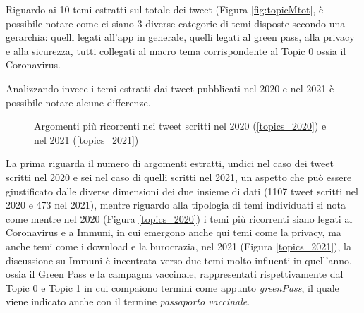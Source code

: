 Riguardo ai 10 temi estratti sul totale dei tweet (Figura \ref{fig:topicMtot}, è possibile notare come ci siano 3 diverse categorie di temi disposte secondo una gerarchia: quelli legati all'app in generale, quelli legati al green pass, alla privacy e alla sicurezza, tutti collegati al macro tema corrispondente al Topic 0 ossia il Coronavirus.

Analizzando invece i temi estratti dai tweet pubblicati nel 2020 e nel 2021 è possibile notare alcune differenze. 
\begin{figure}[H]
	\centering
	\quad
	\quad
	\setlength{\belowcaptionskip}{-10pt}
	\caption{Argomenti più ricorrenti nei tweet scritti nel 2020 (\ref{topics_2020}) e nel 2021 (\ref{topics_2021})}
	\label{fig: topicModels}
\end{figure}
La prima riguarda il numero di argomenti estratti, undici nel caso dei tweet scritti nel 2020 e sei nel caso di quelli scritti nel 2021, un aspetto che può essere giustificato dalle diverse dimensioni dei due insieme di dati (1107 tweet scritti nel 2020 e 473 nel 2021), mentre riguardo alla tipologia di temi individuati si nota come mentre nel 2020 (Figura \ref{topics_2020}) i temi più ricorrenti siano legati al Coronavirus e a Immuni, in cui emergono anche qui temi come la privacy, ma anche temi come i download e la burocrazia, nel 2021 (Figura \ref{topics_2021}), la discussione su Immuni è incentrata verso due temi molto influenti in quell'anno, ossia il Green Pass e la campagna vaccinale, rappresentati rispettivamente dal Topic 0 e Topic 1 in cui compaiono termini come appunto \textit{greenPass}, il quale viene indicato anche con il termine \textit{passaporto vaccinale}.

